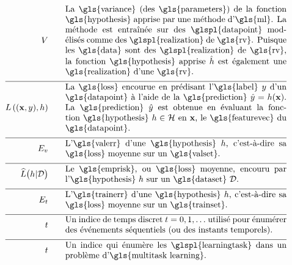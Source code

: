 \begin{align}
	\varianceterm \quad\quad &\parbox{.75\textwidth}{La \gls{variance} (des \gls{parameters}) de la fonction \gls{hypothesis} apprise  par une méthode d’\gls{ml}. La méthode est entraînée sur des \glspl{datapoint} modélisés comme des \glspl{realization} de \gls{rv}. Puisque les \gls{data} sont des \glspl{realization} de \gls{rv}, la fonction \gls{hypothesis} apprise $\learnthypothesis$ est également une \gls{realization} d’une \gls{rv}.} \nonumber \\[2mm] \hline \nonumber\\[-5mm]
	\lossfunc{(\featurevec,\truelabel)}{\hypothesis}  \quad\quad & \parbox{.75\textwidth}{La \gls{loss} encourue en prédisant l'\gls{label} $\truelabel$ d’un \gls{datapoint} à l’aide de la \gls{prediction} $\hat{\truelabel}=h(\featurevec)$. La \gls{prediction} $\hat{\truelabel}$ est obtenue en évaluant la fonction \gls{hypothesis} $\hypothesis \in \hypospace$ en $\featurevec$, le \gls{featurevec} du \gls{datapoint}.} \nonumber \\[2mm] \hline \nonumber\\[-5mm] 
	\valerror \quad\quad &\parbox{.75\textwidth}{L'\gls{valerr} d’une \gls{hypothesis} $\hypothesis$, c’est-à-dire sa \gls{loss} moyenne sur un \gls{valset}.}  \nonumber \\[2mm] \hline \nonumber\\[-5mm]
	\emperror\big(\hypothesis| \dataset \big) \quad\quad &\parbox{.75\textwidth}{Le \gls{emprisk}, ou \gls{loss} moyenne, encouru par l'\gls{hypothesis} $\hypothesis$ sur un \gls{dataset} $\dataset$.} \nonumber  \\[2mm] \hline \nonumber\\[-5mm]
	\trainerror \quad\quad &\parbox{.75\textwidth}{L’\gls{trainerr} d’une \gls{hypothesis} $\hypothesis$, c’est-à-dire sa \gls{loss} moyenne sur un \gls{trainset}.} \nonumber \\[2mm] \hline \nonumber\\[-5mm]
	\timeidx \quad\quad &\parbox{.75\textwidth}{Un indice de temps discret $\timeidx=0,1,\ldots$ utilisé pour énumérer des événements séquentiels (ou des instants temporels).} \nonumber \\[2mm] \hline \nonumber\\[-5mm]
	\taskidx \quad\quad &\parbox{.75\textwidth}{Un indice qui énumère les \glspl{learningtask} dans un problème d'\gls{multitask learning}.} \nonumber
\end{align}

